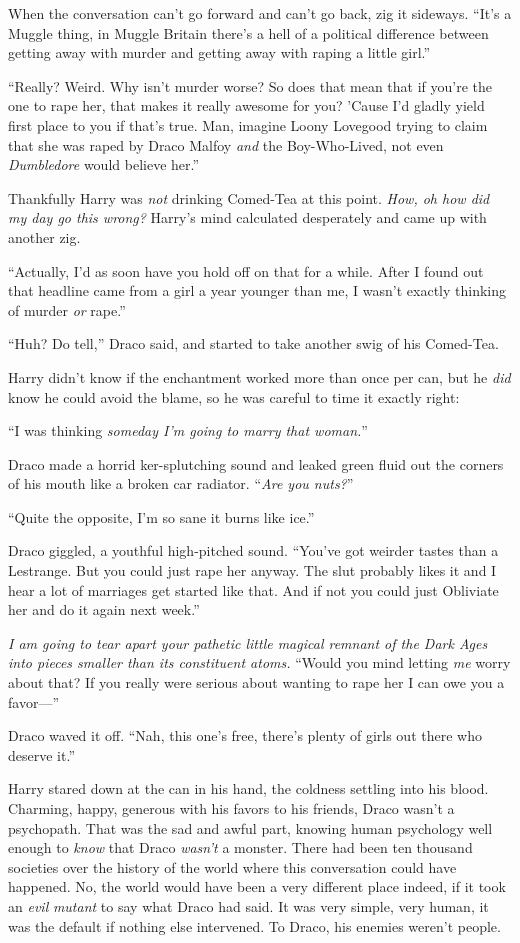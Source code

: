 When the conversation can’t go forward and can’t go back, zig it sideways. “It’s a Muggle thing, in Muggle Britain there’s a hell of a political difference between getting away with murder and getting away with raping a little girl.”

“Really? Weird. Why isn’t murder worse? So does that mean that if you’re the one to rape her, that makes it really awesome for you? ’Cause I’d gladly yield first place to you if that’s true. Man, imagine Loony Lovegood trying to claim that she was raped by Draco Malfoy \emph{and} the Boy-Who-Lived, not even \emph{Dumbledore} would believe her.”

Thankfully Harry was \emph{not} drinking Comed-Tea at this point. \emph{How, oh how did my day go this wrong?} Harry’s mind calculated desperately and came up with another zig.

“Actually, I’d as soon have you hold off on that for a while. After I found out that headline came from a girl a year younger than me, I wasn’t exactly thinking of murder \emph{or} rape.”

“Huh? Do tell,” Draco said, and started to take another swig of his Comed-Tea.

Harry didn’t know if the enchantment worked more than once per can, but he \emph{did} know he could avoid the blame, so he was careful to time it exactly right:

“I was thinking \emph{someday I’m going to marry that woman.}”

Draco made a horrid ker-splutching sound and leaked green fluid out the corners of his mouth like a broken car radiator. “\emph{Are you nuts?}”

“Quite the opposite, I’m so sane it burns like ice.”

Draco giggled, a youthful high-pitched sound. “You’ve got weirder tastes than a Lestrange. But you could just rape her anyway. The slut probably likes it and I hear a lot of marriages get started like that. And if not you could just Obliviate her and do it again next week.”

\emph{I am going to tear apart your pathetic little magical remnant of the Dark Ages into pieces smaller than its constituent atoms.} “Would you mind letting \emph{me} worry about that? If you really were serious about wanting to rape her I can owe you a favor—”

Draco waved it off. “Nah, this one’s free, there’s plenty of girls out there who deserve it.”

Harry stared down at the can in his hand, the coldness settling into his blood. Charming, happy, generous with his favors to his friends, Draco wasn’t a psychopath. That was the sad and awful part, knowing human psychology well enough to \emph{know} that Draco \emph{wasn’t} a monster. There had been ten thousand societies over the history of the world where this conversation could have happened. No, the world would have been a very different place indeed, if it took an \emph{evil} \emph{mutant} to say what Draco had said. It was very simple, very human, it was the default if nothing else intervened. To Draco, his enemies weren’t people.

